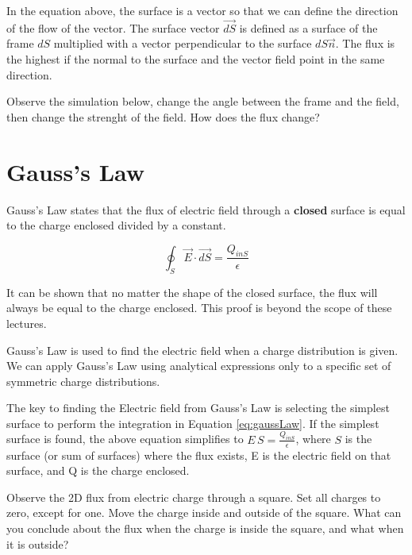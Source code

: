 \documentclass{ximera}
\begin{document}
In the equation above, the surface is a vector so that we can define the direction of the flow of the vector. The surface vector $\vec{dS}$ is defined as a surface of the frame $dS$ multiplied with a vector perpendicular to the surface $dS \vec{n}$. The flux is the highest if the normal to the surface and the vector field point in the same direction. 

\begin{example}

Observe the simulation below, change the angle between the frame and the field, then change the strenght of the field. How does the flux change?



\begin{center}  
\end{center} 


\end{example}




\section{Gauss's Law}


Gauss's Law states that the flux of electric field through a {\bf closed} surface is equal to the charge enclosed divided by a constant.

\begin{equation}
\oint_S \vec{E} \cdot \vec{dS} = \frac{Q_{inS}}{\epsilon}\label{eq:gaussLaw}
\end{equation}


It can be shown that no matter the shape of the closed surface, the flux will always be equal to the charge enclosed. This proof is beyond the scope of these lectures.


Gauss's Law is used to find the electric field when a charge distribution is given. We can apply Gauss's Law using analytical expressions only to a specific set of symmetric charge distributions.


 The key to finding the Electric field from Gauss's Law is selecting the simplest surface to perform the integration in Equation \ref{eq:gaussLaw}. If the simplest surface is found, the above equation simplifies to $E \, S = \frac{Q_{inS}}{\epsilon}$, where $S$ is the surface (or sum of surfaces) where the flux exists, E is the electric field on that surface, and Q is the charge enclosed.
 
\begin{example}

Observe the 2D flux from electric charge through a square. Set all charges to zero, except for one. Move the charge inside and outside of the square. What can you conclude about the flux when the charge is inside the square, and what when it is outside?


\begin{center}  
\end{center} 


\end{example} 
 
\end{document}
